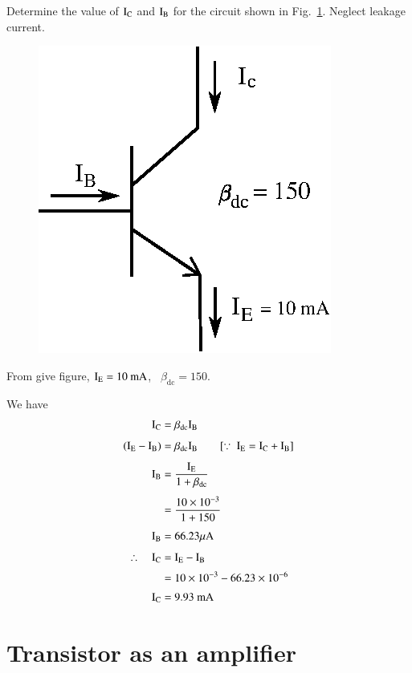 \begin{problem}\label{prob2.11}
Determine the value of $\textrm{I}_{\textrm{C}}$ and $\textrm{I}_{\textrm{B}}$ for the circuit shown in Fig.~\ref{fig2.8}. Neglect leakage current.
\begin{figure}[H]
\centering
\includegraphics{chap2/fig8.eps}
\caption{}\label{fig2.8}
\end{figure}
\end{problem}

\begin{solution}
From give figure, $\textrm{I}_{\textrm{E}}=10\text{~mA}$, \ $\beta_{\text{dc}}=150$.

We have
\begin{align*}
\textrm{I}_{\textrm{C}} &= \beta_{\text{dc}}\textrm{I}_{\textrm{B}}\\[4pt]
(\textrm{I}_{\textrm{E}}-\textrm{I}_{\textrm{B}}) &= \beta_{\text{dc}}\textrm{I}_{\textrm{B}}\qquad [\because \ \textrm{I}_{\textrm{E}}=\textrm{I}_{\textrm{C}}+\textrm{I}_{\textrm{B}}]\\[4pt]
\textrm{I}_{\textrm{B}} &= \frac{\textrm{I}_{\textrm{E}}}{1+\beta_{\text{dc}}}\\[4pt]
&= \frac{10\times 10^{-3}}{1+150}\\[4pt]
\textrm{I}_{\textrm{B}} &= 66.23\mu\textrm{A}\\[4pt]
\therefore\quad \textrm{I}_{\textrm{C}} &= \textrm{I}_{\textrm{E}}-\textrm{I}_{\textrm{B}}\\[2pt]
&= 10\times 10^{-3}-66.23\times 10^{-6}\\[2pt]
\textrm{I}_{\textrm{C}} &= 9.93\text{~mA}
\end{align*}
\end{solution}

\section{Transistor as an amplifier}\label{sec2.3}

